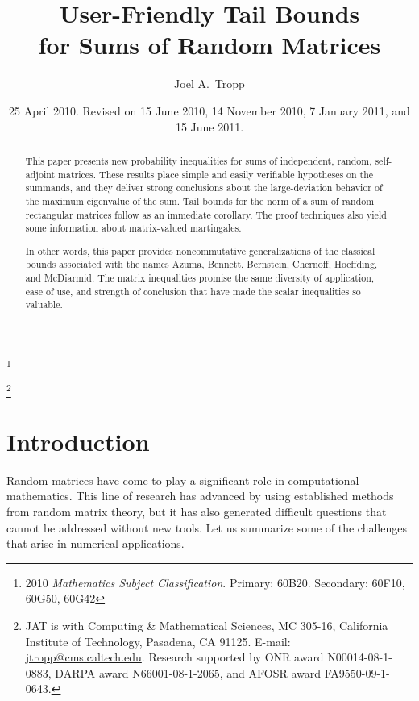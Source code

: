 \documentclass[11pt,letterpaper,twoside,reqno,draft]{amsart}
\theoremstyle{remark}
\numberwithin{equation}{section}
\numberwithin{thm}{section}
\begin{document}
\title[Tail Bounds for Sums of Random Matrices]
{User-Friendly Tail Bounds \\ for Sums of Random Matrices}

\author{Joel A.~Tropp}


\thanks{2010 {\it Mathematics Subject Classification}.
Primary:
60B20. 
Secondary:
60F10, 
60G50, 
60G42
}

\thanks{JAT is with Computing \& Mathematical Sciences, MC 305-16, California Institute of Technology, Pasadena, CA 91125.
E-mail: \url{jtropp@cms.caltech.edu}.
Research supported by ONR award N00014-08-1-0883, DARPA award N66001-08-1-2065, and AFOSR award FA9550-09-1-0643.}

\date{25 April 2010.  Revised on 15 June 2010, 14 November 2010, 7 January 2011, and 15 June 2011.}

\begin{abstract}
This paper presents new probability inequalities for sums of independent, random, self-adjoint matrices.  These results place simple and easily verifiable hypotheses on the summands, and they deliver strong conclusions about the large-deviation behavior of the maximum eigenvalue of the sum.  Tail bounds for the norm of a sum of random rectangular matrices follow as an immediate corollary.  The proof techniques also yield some information about matrix-valued martingales.

In other words, this paper provides noncommutative generalizations of the classical bounds associated with the names Azuma, Bennett, Bernstein, Chernoff, Hoeffding, and McDiarmid.  The matrix inequalities promise the same diversity of application, ease of use, and strength of conclusion that have made the scalar inequalities so valuable.
\end{abstract}

\maketitle

\section{Introduction}

Random matrices have come to play a significant role in computational mathematics.  This line of research has advanced by using established methods from random matrix theory, but it has also generated difficult questions that cannot be addressed without new tools.  Let us summarize some of the challenges that arise in numerical applications.
\end{document}
